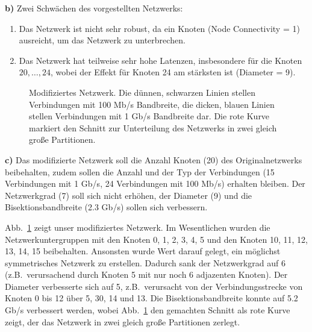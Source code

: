 \textbf{b)} Zwei Schwächen des vorgestellten Netzwerks:
\begin{enumerate}
 \item Das Netzwerk ist nicht sehr robust, da ein Knoten (Node Connectivity = 1) ausreicht, um das Netzwerk zu unterbrechen.
 \item Das Netzwerk hat teilweise sehr hohe Latenzen, insbesondere für die Knoten $20,\dots,24$, wobei der Effekt für Knoten 24 am stärksten ist (Diameter = 9). 
\end{enumerate}

\begin{figure}[tb]
 \centering 
 
 \caption{Modifiziertes Netzwerk. Die dünnen, schwarzen Linien stellen Verbindungen mit 100 Mb/s Bandbreite, die dicken, blauen Linien stellen Verbindungen mit 1 Gb/s Bandbreite dar. Die rote Kurve markiert den Schnitt zur Unterteilung des Netzwerks in zwei gleich große Partitionen.}
 \label{fig:eigenesNetzwerk}
\end{figure}

\textbf{c)} Das modifizierte Netzwerk soll die Anzahl Knoten (20) des Originalnetzwerks beibehalten, zudem sollen die Anzahl und der Typ der Verbindungen (15 Verbindungen mit 1 Gb/s, 24 Verbindungen mit 100 Mb/s) erhalten bleiben. Der Netzwerkgrad (7) soll sich nicht erhöhen, der Diameter (9) und die Bisektionsbandbreite (2.3 Gb/s) sollen sich verbessern.

Abb.~\ref{fig:eigenesNetzwerk} zeigt unser modifiziertes Netzwerk. Im Wesentlichen wurden die Netzwerkuntergruppen mit den Knoten 0, 1, 2, 3, 4, 5 und den Knoten 10, 11, 12, 13, 14, 15 beibehalten. Ansonsten wurde Wert darauf gelegt, ein möglichst symmetrisches Netzwerk zu erstellen. Dadurch sank der Netzwerkgrad auf 6 (z.B.~verursachend durch Knoten 5 mit nur noch 6 adjazenten Knoten). Der Diameter verbesserte sich auf 5, z.B.~verursacht von der Verbindungsstrecke von Knoten 0 bis 12 über 5, 30, 14 und 13. Die Bisektionsbandbreite konnte auf 5.2 Gb/s verbessert werden, wobei Abb.~\ref{fig:eigenesNetzwerk} den gemachten Schnitt als rote Kurve zeigt, der das Netzwerk in zwei gleich große Partitionen zerlegt.